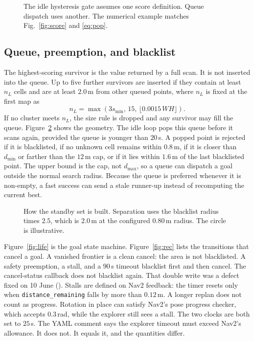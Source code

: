 \documentclass[11pt]{article}
\begin{document}
\begin{figure}[ht]
\centering
\FigScaleBug
\caption{The idle hysteresis gate assumes one score definition. Queue dispatch uses another. The numerical example matches Fig.~\ref{fig:score} and \eqref{eq:pop}.}
\label{fig:scale}
\end{figure}

\subsection{Queue, preemption, and blacklist}
The highest-scoring survivor is the value returned by a full scan. It is not inserted into the queue. Up to five further survivors are inserted if they contain at least $n_L$ cells and are at least $2.0$\,m from other queued points, where $n_L$ is fixed at the first map as
\begin{equation}
n_L=\max(3 s_{\min},\,15,\,\lfloor 0.0015\,WH\rfloor).
\label{eq:nl}
\end{equation}
If no cluster meets $n_L$, the size rule is dropped and any survivor may fill the queue. Figure~\ref{fig:queue} shows the geometry. The idle loop pops this queue before it scans again, provided the queue is younger than $20$\,s. A popped point is rejected if it is blacklisted, if no unknown cell remains within $0.8$\,m, if it is closer than $d_{\min}$ or farther than the $12$\,m cap, or if it lies within $1.6$\,m of the last blacklisted point. The upper bound is the cap, not $d_{\max}$, so a queue can dispatch a goal outside the normal search radius. Because the queue is preferred whenever it is non-empty, a fast success can send a stale runner-up instead of recomputing the current best.

\begin{figure}[ht]
\centering
\FigQueue
\caption{How the standby set is built. Separation uses the blacklist radius times $2.5$, which is $2.0$\,m at the configured $0.80$\,m radius. The circle is illustrative.}
\label{fig:queue}
\end{figure}

Figure~\ref{fig:life} is the goal state machine. Figure~\ref{fig:rec} lists the transitions that cancel a goal. A vanished frontier is a clean cancel: the area is not blacklisted. A safety preemption, a stall, and a $90$\,s timeout blacklist first and then cancel. The cancel-status callback does not blacklist again. That double write was a defect fixed on 10 June (). Stalls are defined on Nav2 feedback: the timer resets only when \texttt{distance\_remaining} falls by more than $0.12$\,m. A longer replan does not count as progress. Rotation in place can satisfy Nav2's pose progress checker, which accepts $0.3$\,rad, while the explorer still sees a stall. The two clocks are both set to $25$\,s. The YAML comment says the explorer timeout must exceed Nav2's allowance. It does not. It equals it, and the quantities differ.
\end{document}
